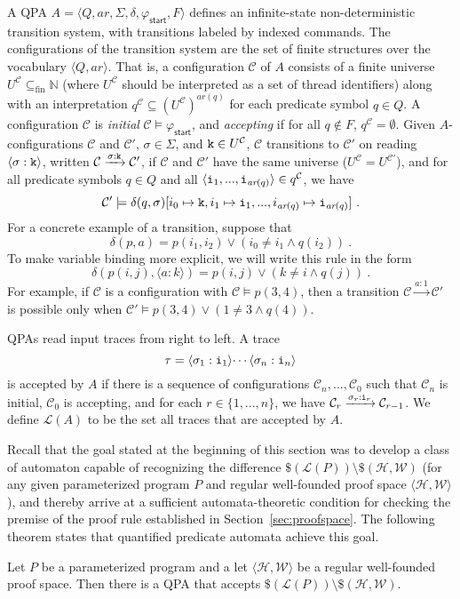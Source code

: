 \documentclass[9pt,nocopyrightspace]{sigplanconf}
\theoremstyle{definition}
\newcommand{\tuple}[1]{\langle #1 \rangle}
\newcommand{\rankformulas}{\mathscr{W}}
\newcommand{\idx}[1]{\text{\rm\texttt{#1}}}
\newcommand{\ic}[2]{{\tuple{#1 : #2}}}
\newcommand{\lang}{\mathcal{L}}
\newcommand{\start}{\mathsf{start}}
\renewcommand{\phi}{\varphi}
\newcommand{\config}{\mathcal{C}}
\newcommand{\ctrans}[4]{#1 \xrightarrow{#2:#3} #4}
\newcommand{\ar}{\textit{ar}}
\begin{document}
A QPA $A = \tuple{Q,\ar,\Sigma,\delta,\phi_\start,F}$ defines an
infinite-state non-deterministic transition system, with transitions labeled
by indexed commands.  The configurations of the transition system are the set
of finite structures over the vocabulary $\tuple{Q,\ar}$.  That is, a
configuration $\config$ of $A$ consists of a finite universe $U^\config
\subseteq_{\text{fin}} \mathbb{N}$ (where $U^\config$ should be interpreted as
a set of thread identifiers) along with an interpretation $q^\config \subseteq
(U^\config)^{\ar(q)}$ for each predicate symbol $q \in Q$.  A configuration
$\config$ is \emph{initial} $\config \models \phi_\start$, and
\emph{accepting} if for all $q \notin F$, $q^\config = \emptyset$.  Given
$A$-configurations $\config$ and $\config'$, $\sigma \in \Sigma$, and $\idx{k}
\in U^\config$, $\config$ transitions to $\config'$ on reading
$\ic{\sigma}{\idx{k}}$, written $\ctrans{\config}{\sigma}{\idx{k}}{\config'}$,
if $\config$ and $\config'$ have the same universe ($U^\config =
U^{\config'}$), and for all predicate symbols $q \in Q$ and all
$\tuple{\idx{i}_1,...,\idx{i}_{\ar(q)}} \in q^\config$, we have
\[ \config' \models \delta(q,\sigma)[i_0 \mapsto \idx{k}, i_1 \mapsto \idx{i}_1,..., i_{\ar(q)} \mapsto \idx{i}_{\ar(q)}]\ . \]
For a concrete example of a transition, suppose that \[\delta(p,a) =
p(i_1,i_2) \lor (i_0 \neq i_1 \land q(i_2))\ .\] To make variable binding more
explicit, we will write this rule in the form \[\delta(p(i,j),
\tuple{a:k}) = p(i,j) \lor (k \neq i \land q(j))\ .\] For example,
if $\config$ is a configuration with $\config \models p(3,4)$, then a
transition $\ctrans{\config}{a}{1}{\config'}$ is possible only when ${\config' \models p(3,4) \lor (1 \neq 3 \land q(4))}$.



QPAs read input traces from right to left.  A trace \[\tau =
\ic{\sigma_1}{\idx{i}_1} \dotsi \ic{\sigma_n}{\idx{i}_n}\] is accepted by $A$
if there is a sequence of configurations $\config_{n},...,\config_{0}$ such
that $\config_{n}$ is initial, $\config_0$ is accepting, and for each $r \in
\{1,..., n\}$, we have
$\ctrans{\config_{r}}{\sigma_{r}}{\idx{i}_{r}}{\config_{r-1}}$.  We define
$\lang(A)$ to be the set all traces that are accepted by $A$.



Recall that the goal stated at the beginning of this section was to develop a
class of automaton capable of recognizing the difference $\$(\lang(P))
\setminus \$(\mathscr{H},\rankformulas)$ (for any given parameterized program $P$ and
regular well-founded proof space $\tuple{\mathscr{H},\rankformulas}$), and
thereby arrive at a sufficient automata-theoretic condition for checking the
premise of the proof rule established in Section~\ref{sec:proofspace}.  The following
theorem states that quantified predicate automata achieve this goal.
\begin{theorem} \label{thm:qpa_rec}
  Let $P$ be a parameterized program and a let $\tuple{\mathscr{H},\rankformulas}$ be a
  regular well-founded proof space.  Then
  there is a QPA that accepts $\$(\lang(P)) \setminus \$(\mathscr{H},\rankformulas)$.
\end{theorem}
\end{document}
